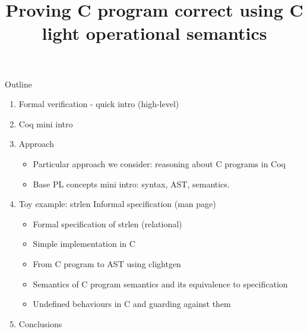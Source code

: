 \documentclass{beamer}
\title{Proving C program correct using C light operational semantics}
\date{ }
\begin{document}
\maketitle

\begin{frame}{Outline}
\begin{enumerate}
\item Formal verification - quick intro (high-level)
\item Coq mini intro 
\item Approach
\begin{itemize}   
\item Particular approach we consider: reasoning about C programs in Coq
\item Base PL concepts mini intro: syntax, AST, semantics.
\end{itemize}{}
\item Toy example: strlen Informal specification (man page)
\begin{itemize}

\item Formal specification of strlen (relational)
\item Simple implementation in C
\item From C program to AST using clightgen
\item Semantics of C program semantics and its equivalence to specification
\item Undefined behaviours in C and guarding against them
\end{itemize}{}
\item Conclusions
\end{enumerate} 
\end{frame}{}

\end{document}
